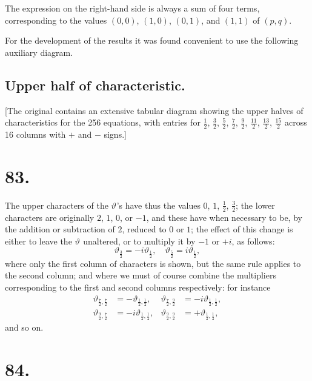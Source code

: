 \documentclass[11pt,a4paper]{article}
\newcommand{\uth}[1]{\vartheta_{#1}}
\begin{document}
The expression on the right-hand side is always a sum of four terms, corresponding to the values $(0,0)$, $(1,0)$, $(0,1)$, and $(1,1)$ of $(p,q)$.

For the development of the results it was found convenient to use the following auxiliary diagram.

\subsection*{Upper half of characteristic.}

[The original contains an extensive tabular diagram showing the upper halves of characteristics for the 256 equations, with entries for $\frac{1}{2}$, $\frac{3}{2}$, $\frac{5}{2}$, $\frac{7}{2}$, $\frac{9}{2}$, $\frac{11}{2}$, $\frac{13}{2}$, $\frac{15}{2}$ across 16 columns with $+$ and $-$ signs.]

\newpage
\section*{83.}
\label{sec:83}

The upper characters of the $\uth{}$'s have thus the values $0$, $1$, $\frac{1}{2}$, $\frac{3}{2}$; the lower characters are originally $2$, $1$, $0$, or $-1$, and these have when necessary to be, by the addition or subtraction of $2$, reduced to $0$ or $1$; the effect of this change is either to leave the $\uth{}$ unaltered, or to multiply it by $-1$ or $+i$, as follows:
\[
\uth{\frac{3}{2}} = -i\uth{\frac{1}{2}}, \quad \uth{\frac{5}{2}} = i\uth{\frac{1}{2}},
\]
where only the first column of characters is shown, but the same rule applies to the second column; and where we must of course combine the multipliers corresponding to the first and second columns respectively: for instance
\begin{align*}
\uth{\frac{7}{2}, \frac{7}{2}} &= -\uth{\frac{1}{2}, \frac{1}{2}}, &
\uth{\frac{7}{2}, \frac{9}{2}} &= -i\uth{\frac{1}{2}, \frac{1}{2}}, \\
\uth{\frac{9}{2}, \frac{7}{2}} &= -i\uth{\frac{1}{2}, \frac{1}{2}}, &
\uth{\frac{9}{2}, \frac{9}{2}} &= +\uth{\frac{1}{2}, \frac{1}{2}},
\end{align*}
and so on.

\newpage
\section*{84.}
\label{sec:84}
\end{document}
